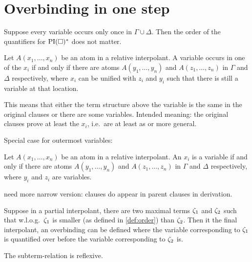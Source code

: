 \documentclass[,%
	paper=a4,%
	DIV14, 
	liststotoc,
	bibtotoc,
	draft=false,%
	numbers=noendperiod
]{scrartcl}
\begin{document}
\newcommand{\lif}[1]{\lift{\Delta}{#1}{x}}



\section{Overbinding in one step}


\begin{conj}
	Suppose every variable occurs only once in $\Gamma \cup \Delta$.
	Then the order of the quantifiers for $\operatorname{PI}(\square)^*$ does not matter.
\end{conj}
\begin{prop}

	Let $A(x_1, \ldots, x_n)$ be an atom in a relative interpolant.
	A variable occurs in one of the $x_i$ if and only if there are atoms $A(y_1, \ldots, y_n)$ and $A(z_1, \ldots, z_n)$ in $\Gamma$ and $\Delta$ respectively, where $x_i$ can be unified with $z_i$ and $y_i$ such that there is still a variable at that location.

	This means that either the term structure above the variable is the same in the original clauses or there are some variables. Intended meaning: the original clauses prove at least the $x_i$, i.e.~are at least as or more general.
	\medskip

	Special case for outermost variables:

	Let $A(x_1, \ldots, x_n)$ be an atom in a relative interpolant.
	An $x_i$ is a variable if and only if there are atoms $A(y_1, \ldots, y_n)$ and $A(z_1, \ldots, z_n)$ in $\Gamma$ and $\Delta$ respectively, where $y_i$ and $z_i$ are variables.
\end{prop}

need more narrow version: clauses do appear in parent clauses in derivation.



\begin{prop}


	Suppose in a partial interpolant, there are two maximal terms $\zeta_{1}$ and $\zeta_{2}$ such that w.l.o.g.~$\zeta_{1}$ is smaller (as defined in \ref{def:order}) than $\zeta_{2}$. Then it the final interpolant, an overbinding can be defined where the variable corresponding to $\zeta_{1}$ is quantified over before the variable corresponding to $\zeta_{2}$ is.
\end{prop}

The subterm-relation is reflexive.
\end{document}
